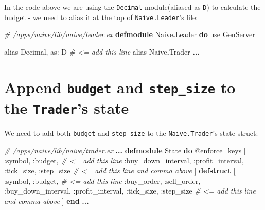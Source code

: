 \documentclass[
  oneside]{book}
\newenvironment{Shaded}{\begin{snugshade}}{\end{snugshade}}
\newcommand{\CommentTok}[1]{\textcolor[rgb]{0.56,0.35,0.01}{\textit{#1}}}
\newcommand{\ConstantTok}[1]{\textcolor[rgb]{0.56,0.35,0.01}{#1}}
\newcommand{\ImportTok}[1]{#1}
\newcommand{\KeywordTok}[1]{\textcolor[rgb]{0.13,0.29,0.53}{\textbf{#1}}}
\newcommand{\NormalTok}[1]{#1}
\newcommand{\OperatorTok}[1]{\textcolor[rgb]{0.81,0.36,0.00}{\textbf{#1}}}
\newcommand{\OtherTok}[1]{\textcolor[rgb]{0.56,0.35,0.01}{#1}}
\newcommand{\VariableTok}[1]{\textcolor[rgb]{0.00,0.00,0.00}{#1}}
\begin{document}
In the code above we are using the \texttt{Decimal} module(aliased as \texttt{D}) to calculate the budget - we need to alias it at the top of \texttt{Naive.Leader}'s file:

\begin{Shaded}
\begin{Highlighting}[]
\CommentTok{\# /apps/naive/lib/naive/leader.ex}
\KeywordTok{defmodule} \ConstantTok{Naive}\OperatorTok{.}\ConstantTok{Leader} \KeywordTok{do}
  \ImportTok{use} \ConstantTok{GenServer}

  \ImportTok{alias} \ConstantTok{Decimal}\NormalTok{, }\VariableTok{as:}\NormalTok{ D }\CommentTok{\# \textless{}= add this line}
  \ImportTok{alias} \ConstantTok{Naive}\OperatorTok{.}\ConstantTok{Trader}
  \OperatorTok{...}
\end{Highlighting}
\end{Shaded}

\section{\texorpdfstring{Append \texttt{budget} and \texttt{step\_size} to the \texttt{Trader}'s state}{Append budget and step\_size to the Trader's state}}\label{append-budget-and-step_size-to-the-traders-state}

We need to add both \texttt{budget} and \texttt{step\_size} to the \texttt{Naive.Trader}'s state struct:

\begin{Shaded}
\begin{Highlighting}[]
  \CommentTok{\# /apps/naive/lib/naive/trader.ex}
  \OperatorTok{...}
  \KeywordTok{defmodule} \ConstantTok{State} \KeywordTok{do}
    \OtherTok{@enforce\_keys} \OtherTok{[}
      \VariableTok{:symbol}\NormalTok{,}
      \VariableTok{:budget}\NormalTok{, }\CommentTok{\# \textless{}= add this line}
      \VariableTok{:buy\_down\_interval}\NormalTok{,}
      \VariableTok{:profit\_interval}\NormalTok{,}
      \VariableTok{:tick\_size}\NormalTok{,}
      \VariableTok{:step\_size} \CommentTok{\# \textless{}= add this line and comma above}
    \OtherTok{]}
    \KeywordTok{defstruct} \OtherTok{[}
      \VariableTok{:symbol}\NormalTok{,}
      \VariableTok{:budget}\NormalTok{, }\CommentTok{\# \textless{}= add this line}
      \VariableTok{:buy\_order}\NormalTok{,}
      \VariableTok{:sell\_order}\NormalTok{,}
      \VariableTok{:buy\_down\_interval}\NormalTok{,}
      \VariableTok{:profit\_interval}\NormalTok{,}
      \VariableTok{:tick\_size}\NormalTok{,}
      \VariableTok{:step\_size} \CommentTok{\# \textless{}= add this line and comma above}
    \OtherTok{]}
  \KeywordTok{end}
  \OperatorTok{...}
\end{Highlighting}
\end{Shaded}
\end{document}
